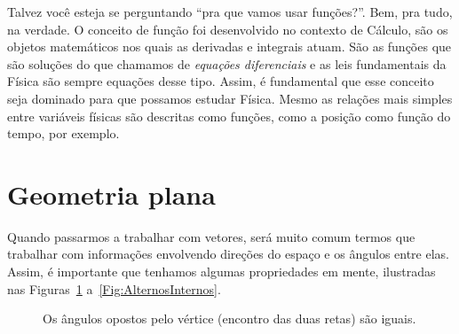 Talvez você esteja se perguntando ``pra que vamos usar funções?''. Bem, pra tudo, na verdade. O conceito de função foi desenvolvido no contexto de Cálculo, são os objetos matemáticos nos quais as derivadas e integrais atuam. São as funções que são soluções do que chamamos de \emph{equações diferenciais} e as leis fundamentais da Física são sempre equações desse tipo. Assim, é fundamental que esse conceito seja dominado para que possamos estudar Física. Mesmo as relações mais simples entre variáveis físicas são descritas como funções, como a posição como função do tempo, por exemplo.

\section{Geometria plana}

Quando passarmos a trabalhar com vetores, será muito comum termos que trabalhar com informações envolvendo direções do espaço e os ângulos entre elas. Assim, é importante que tenhamos algumas propriedades em mente, ilustradas nas Figuras~\ref{Fig:PropAngulosRetas1} a~\ref{Fig:AlternosInternos}.
\begin{figure}
\centering
{}
\caption{Os ângulos opostos pelo vértice (encontro das duas retas) são iguais. \label{Fig:PropAngulosRetas1}}
\end{figure}

